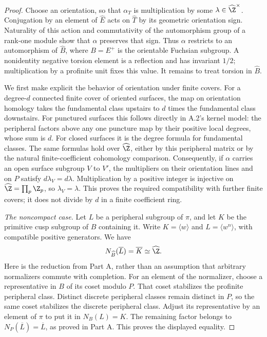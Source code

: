 \begin{proof}
Choose an orientation, so that $\alpha_T$ is multiplication by some
$\lambda\in\widehat\Z^\times$.  Conjugation by an element of
$\widehat E$ acts on $\widehat T$ by its geometric orientation sign.
Naturality of this action and commutativity of the automorphism group of a
rank-one module show that $\alpha$ preserves that sign.  Thus $\alpha$
restricts to an automorphism of $\widehat B$, where $B=E^+$ is the
orientable Fuchsian subgroup.  A nonidentity negative torsion element is a
reflection and has invariant $1/2$; multiplication by a profinite unit
fixes this value.  It remains to treat torsion in $\widehat B$.

We first make explicit the behavior of orientation under finite covers.
For a degree-$d$ connected finite cover of oriented surfaces, the map on
orientation homology takes the fundamental class upstairs to $d$ times
the fundamental class downstairs.  For punctured surfaces this follows
directly in A.2's kernel model: the peripheral factors above any one
puncture map by their positive local degrees, whose sum is $d$.
For closed surfaces it is the degree formula for fundamental classes.
The same formulas hold over $\widehat\Z$, either by this peripheral
matrix or by the natural finite-coefficient cohomology comparison.
Consequently, if $\alpha$ carries an open surface subgroup $V$ to $V'$,
the multipliers on their orientation lines and on $P$ satisfy
$d\lambda_V=d\lambda$.  Multiplication by a positive integer is
injective on $\widehat\Z=\prod_p\Z_p$, so $\lambda_V=\lambda$.
This proves the required compatibility with further finite covers; it
does not divide by $d$ in a finite coefficient ring.

\emph{The noncompact case.}
Let $L$ be a peripheral subgroup of $\pi$, and let $K$ be the primitive
cusp subgroup of $B$ containing it.  Write $K=\langle w\rangle$ and
$L=\langle w^n\rangle$, with compatible positive generators.
We have
\[
 N_{\widehat B}(\overline L)=\overline K\simeq\widehat\Z.
\]
Here is the reduction from Part A, rather than an assumption that arbitrary
normalizers commute with completion.  For an element of the normalizer,
choose a representative in $B$ of its coset modulo $P$.  That coset
stabilizes the profinite peripheral class.  Distinct discrete peripheral
classes remain distinct in $P$, so the same coset stabilizes the discrete
peripheral class.  Adjust its representative by an element of $\pi$ to
put it in $N_B(L)=K$.  The remaining factor belongs to
$N_P(\overline L)=\overline L$, as proved in Part A.  This proves the
displayed equality.


\end{proof}
